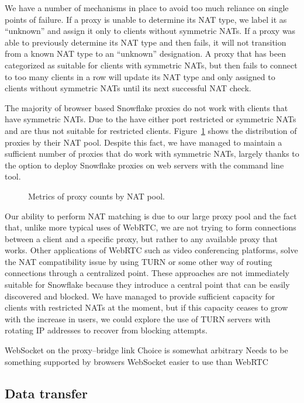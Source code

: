 \documentclass[letterpaper,twocolumn]{article}
\begin{document}
We have a number of
mechanisms in place to avoid too much reliance on single points of failure. If a
proxy is unable to determine its NAT type, we label it as ``unknown'' and assign it only to clients without symmetric NATs. If a proxy
was able to previously determine its NAT type and then fails, it will not transition from a known
NAT type to an ``unknown'' designation. A proxy that has been categorized as suitable for clients
with symmetric NATs, but then fails to connect to too many clients in a row will update its NAT type
and only assigned to clients without symmetric NATs until its next successful NAT check.

The majority of browser based Snowflake proxies do not work with clients that have symmetric NATs.
Due to the have either port restricted or symmetric NATs and are thus not suitable
for restricted clients. Figure~\ref{fig:proxies-by-nats} shows the distribution of proxies by
their NAT pool. Despite this fact, we have managed to maintain a sufficient number of proxies that do
work with symmetric NATs, largely thanks to the option to deploy Snowflake proxies on web servers with
the command line tool.

\begin{figure}
\caption{
Metrics of proxy counts by NAT pool.
}
\label{fig:proxies-by-nats}
\end{figure}


Our ability to perform NAT matching is due to our large proxy pool and the fact that, unlike more
typical uses of WebRTC, we are not trying to form connections between a client and a specific proxy,
but rather to any available proxy that works. Other applications of WebRTC such as video conferencing
platforms, solve the NAT compatibility issue by using TURN or some other way of routing connections
through a centralized point. These approaches are not immediately suitable for Snowflake because
they introduce a central point that can be easily discovered and blocked. We have managed to
provide sufficient capacity for clients with restricted NATs at the moment, but if this capacity
ceases to grow with the increase in users, we could explore the use of TURN servers with rotating
IP addresses to recover from blocking attempts.


WebSocket on the proxy--bridge link
Choice is somewhat arbitrary
Needs to be something supported by browsers
WebSocket easier to use than WebRTC

\subsection{Data transfer}
\label{sec:data-transfer}
\end{document}
